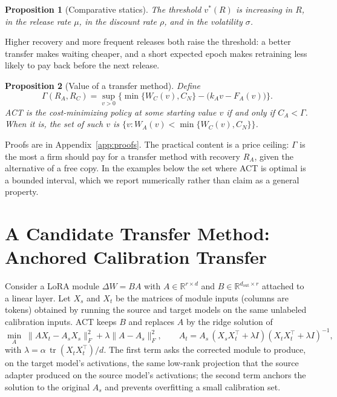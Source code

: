 \documentclass[preprint,12pt,authoryear]{elsarticle}
\newtheorem{proposition}{Proposition}
\begin{document}
\begin{proposition}[Comparative statics]\label{prop:cs}
The threshold $v^*(R)$ is increasing in $R$, in the release rate $\mu$, in the discount rate $\rho$, and in the
volatility $\sigma$.
\end{proposition}

Higher recovery and more frequent releases both raise the threshold: a better transfer makes waiting cheaper,
and a short expected epoch makes retraining less likely to pay back before the next release.

\begin{proposition}[Value of a transfer method]\label{prop:act}
Define
\begin{equation}
\Gamma(R_A,R_C)=\sup_{v>0}\Big\{\min\{W_C(v),C_N\}-\big(k_Av-F_A(v)\big)\Big\}.
\end{equation}
ACT is the cost-minimizing policy at some starting value $v$ if and only if $C_A<\Gamma$. When it is, the set of such
$v$ is $\{v: W_A(v)<\min\{W_C(v),C_N\}\}$.
\end{proposition}

Proofs are in Appendix~\ref{app:proofs}. The practical content is a price ceiling: $\Gamma$ is the most a firm should
pay for a transfer method with recovery $R_A$, given the alternative of a free copy. In the examples below the
set where ACT is optimal is a bounded interval, which we report numerically rather than claim as a general property.

\section{A Candidate Transfer Method: Anchored Calibration Transfer}\label{sec:act}

Consider a LoRA module $\Delta W=BA$ with $A\in\mathbb R^{r\times d}$ and $B\in\mathbb R^{d_{\text{out}}\times r}$ attached to a
linear layer. Let $X_s$ and $X_t$ be the matrices of module inputs (columns are tokens) obtained by running the source
and target models on the same unlabeled calibration inputs. ACT keeps $B$ and replaces $A$ by the ridge solution of
\begin{equation}
\min_{A}\;\|AX_t-A_sX_s\|_F^2+\lambda\|A-A_s\|_F^2,\qquad
A_t=A_s\,(X_sX_t^{\top}+\lambda I)(X_tX_t^{\top}+\lambda I)^{-1},
\end{equation}
with $\lambda=\alpha\,\operatorname{tr}(X_tX_t^{\top})/d$. The first term asks the corrected module to produce, on the
target model's activations, the same low-rank projection that the source adapter produced on the source model's
activations; the second term anchors the solution to the original $A_s$ and prevents overfitting a small calibration
set.
\end{document}
